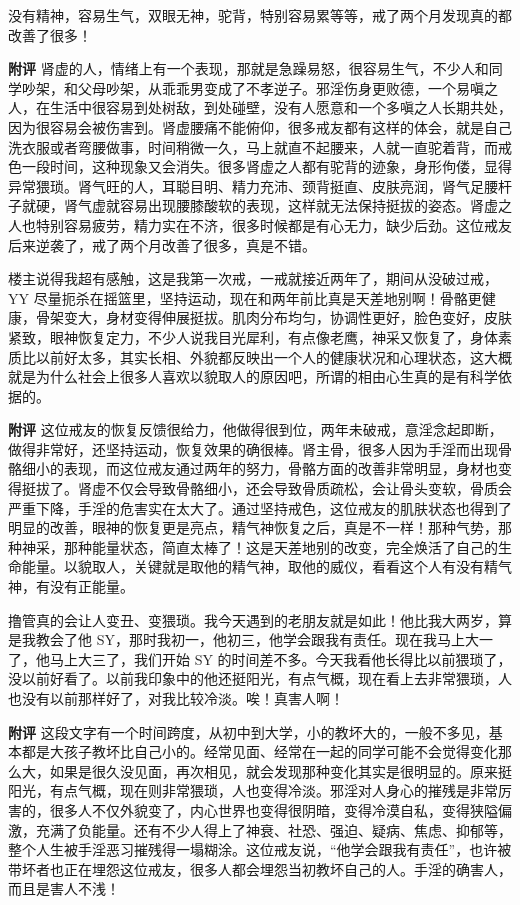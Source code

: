 \begin{case}[变丑]
    没有精神，容易生气，双眼无神，驼背，特别容易累等等，戒了两个月发现真的都改善了很多！

    \textbf{附评} 肾虚的人，情绪上有一个表现，那就是急躁易怒，很容易生气，不少人和同学吵架，和父母吵架，从乖乖男变成了不孝逆子。邪淫伤身更败德，一个易嗔之人，在生活中很容易到处树敌，到处碰壁，没有人愿意和一个多嗔之人长期共处，因为很容易会被伤害到。肾虚腰痛不能俯仰，很多戒友都有这样的体会，就是自己洗衣服或者弯腰做事，时间稍微一久，马上就直不起腰来，人就一直驼着背，而戒色一段时间，这种现象又会消失。很多肾虚之人都有驼背的迹象，身形佝偻，显得异常猥琐。肾气旺的人，耳聪目明、精力充沛、颈背挺直、皮肤亮润，肾气足腰杆子就硬，肾气虚就容易出现腰膝酸软的表现，这样就无法保持挺拔的姿态。肾虚之人也特别容易疲劳，精力实在不济，很多时候都是有心无力，缺少后劲。这位戒友后来逆袭了，戒了两个月改善了很多，真是不错。
\end{case}

\begin{case}[变丑]
    楼主说得我超有感触，这是我第一次戒，一戒就接近两年了，期间从没破过戒，YY 尽量扼杀在摇篮里，坚持运动，现在和两年前比真是天差地别啊！骨骼更健康，骨架变大，身材变得伸展挺拔。肌肉分布均匀，协调性更好，脸色变好，皮肤紧致，眼神恢复定力，不少人说我目光犀利，有点像老鹰，神采又恢复了，身体素质比以前好太多，其实长相、外貌都反映出一个人的健康状况和心理状态，这大概就是为什么社会上很多人喜欢以貌取人的原因吧，所谓的相由心生真的是有科学依据的。

    \textbf{附评} 这位戒友的恢复反馈很给力，他做得很到位，两年未破戒，意淫念起即断，做得非常好，还坚持运动，恢复效果的确很棒。肾主骨，很多人因为手淫而出现骨骼细小的表现，而这位戒友通过两年的努力，骨骼方面的改善非常明显，身材也变得挺拔了。肾虚不仅会导致骨骼细小，还会导致骨质疏松，会让骨头变软，骨质会严重下降，手淫的危害实在太大了。通过坚持戒色，这位戒友的肌肤状态也得到了明显的改善，眼神的恢复更是亮点，精气神恢复之后，真是不一样！那种气势，那种神采，那种能量状态，简直太棒了！这是天差地别的改变，完全焕活了自己的生命能量。以貌取人，关键就是取他的精气神，取他的威仪，看看这个人有没有精气神，有没有正能量。
\end{case}

\begin{case}[变丑]
    撸管真的会让人变丑、变猥琐。我今天遇到的老朋友就是如此！他比我大两岁，算是我教会了他 SY，那时我初一，他初三，他学会跟我有责任。现在我马上大一了，他马上大三了，我们开始 SY 的时间差不多。今天我看他长得比以前猥琐了，没以前好看了。以前我印象中的他还挺阳光，有点气概，现在看上去非常猥琐，人也没有以前那样好了，对我比较冷淡。唉！真害人啊！

    \textbf{附评} 这段文字有一个时间跨度，从初中到大学，小的教坏大的，一般不多见，基本都是大孩子教坏比自己小的。经常见面、经常在一起的同学可能不会觉得变化那么大，如果是很久没见面，再次相见，就会发现那种变化其实是很明显的。原来挺阳光，有点气概，现在则非常猥琐，人也变得冷淡。邪淫对人身心的摧残是非常厉害的，很多人不仅外貌变了，内心世界也变得很阴暗，变得冷漠自私，变得狭隘偏激，充满了负能量。还有不少人得上了神衰、社恐、强迫、疑病、焦虑、抑郁等，整个人生被手淫恶习摧残得一塌糊涂。这位戒友说，“他学会跟我有责任”，也许被带坏者也正在埋怨这位戒友，很多人都会埋怨当初教坏自己的人。手淫的确害人，而且是害人不浅！
\end{case}

